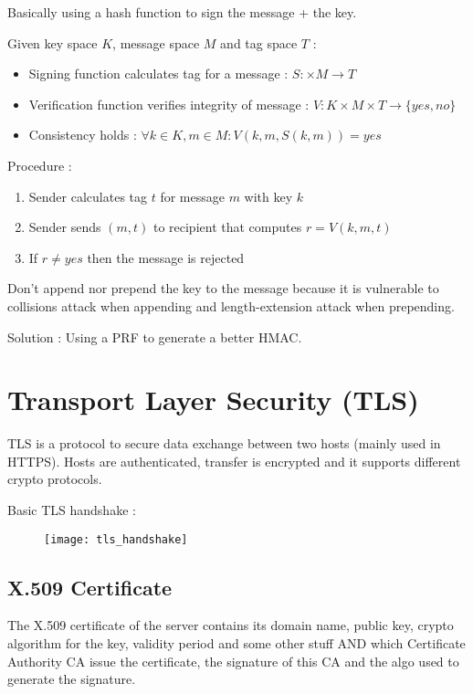 Basically using a hash function to sign the message + the key.

Given key space $K$, message space $M$ and tag space $T$ :
\begin{itemize}
    \item Signing function calculates tag for a message : $S : \times M \rightarrow T$
    \item Verification function verifies integrity of message : $V : K \times M \times T \rightarrow \{yes, no\}$
    \item Consistency holds : $\forall k \in K, m \in M : V(k, m, S(k, m)) = yes$
\end{itemize}

Procedure :
\begin{enumerate}
    \item Sender calculates tag $t$ for message $m$ with key $k$
    \item Sender sends $(m, t)$ to recipient that computes $r=V(k, m, t)$
    \item If $r \neq yes$ then the message is rejected
\end{enumerate}

Don't append nor prepend the key to the message because it is vulnerable to collisions attack when appending and length-extension attack when prepending.

Solution : Using a PRF to generate a better HMAC.

\chapter{Transport Layer Security (TLS)}

TLS is a protocol to secure data exchange between two hosts (mainly used in HTTPS). Hosts are
authenticated, transfer is encrypted and it supports different crypto protocols.

Basic TLS handshake :

\begin{figure}[H]
    \centering
    \texttt{[image: tls\_handshake]}
\end{figure}

\section{X.509 Certificate}

The X.509 certificate of the server contains its domain name, public key, crypto algorithm for the key, validity period and some other stuff AND which Certificate Authority CA issue the certificate, the signature of this CA and the algo used to generate the signature.


